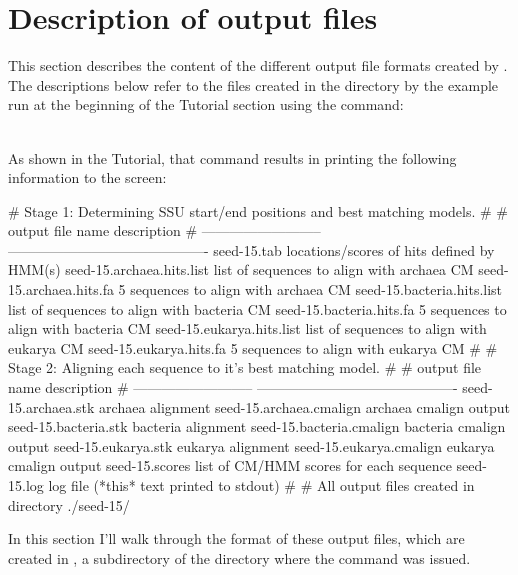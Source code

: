 \section{Description of output files}
\label{section:output}

This section describes the content of the different output file
formats created by . The descriptions below refer to
the files created in the  directory by the example run
at the beginning of the Tutorial section using the command:

\\

As shown in the Tutorial, that command results in 
printing the following information to the screen:

\begin{sreoutput}
# Stage 1: Determining SSU start/end positions and best matching models.
#
# output file name            description                                
# --------------------------  -------------------------------------------
  seed-15.tab                 locations/scores of hits defined by HMM(s)
  seed-15.archaea.hits.list   list of sequences to align with archaea CM
  seed-15.archaea.hits.fa           5 sequences to align with archaea CM
  seed-15.bacteria.hits.list  list of sequences to align with bacteria CM
  seed-15.bacteria.hits.fa          5 sequences to align with bacteria CM
  seed-15.eukarya.hits.list   list of sequences to align with eukarya CM
  seed-15.eukarya.hits.fa           5 sequences to align with eukarya CM
#
# Stage 2: Aligning each sequence to it's best matching model.
#
# output file name            description
# --------------------------  -------------------------------------------
  seed-15.archaea.stk         archaea alignment
  seed-15.archaea.cmalign     archaea cmalign output
  seed-15.bacteria.stk        bacteria alignment
  seed-15.bacteria.cmalign    bacteria cmalign output
  seed-15.eukarya.stk         eukarya alignment
  seed-15.eukarya.cmalign     eukarya cmalign output
  seed-15.scores              list of CM/HMM scores for each sequence
  seed-15.log                 log file (*this* text printed to stdout)
#
# All output files created in directory ./seed-15/
\end{sreoutput}

In this section I'll walk through the format of these output files,
which are created in , a subdirectory of the directory
where the  command was issued.

